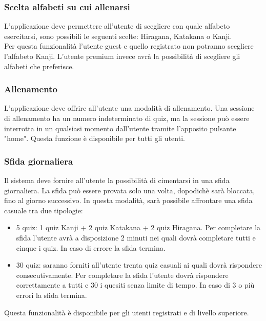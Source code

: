 \subsubsection{Scelta alfabeti su cui allenarsi} \label{req_scelta_alfabeto}
L'applicazione deve permettere all'utente di scegliere con quale alfabeto esercitarsi, sono possibili le seguenti scelte: Hiragana, Katakana o Kanji. \\
Per questa funzionalità l'utente guest e quello registrato non potranno scegliere l'alfabeto Kanji. L'utente premium invece avrà la possibilità di scegliere gli alfabeti che preferisce.

\subsubsection{Allenamento} \label{req_allenamento}
L'applicazione deve offrire all'utente una modalità di allenamento. Una sessione di allenamento ha un numero indeterminato di quiz, ma la sessione può essere interrotta in un qualsiasi momento dall'utente tramite l'apposito pulsante "home". Questa funzione è disponibile per tutti gli utenti.

\subsubsection{Sfida giornaliera} \label{req_sfida_giornaliera}
Il sistema deve fornire all'utente la possibilità di cimentarsi in una sfida giornaliera. La sfida può essere provata solo una volta, dopodichè sarà bloccata, fino al giorno successivo. In questa modalità, sarà possibile affrontare una sfida casuale tra due tipologie:
\begin{itemize}
    \item 5 quiz: 1 quiz Kanji + 2 quiz Katakana + 2 quiz Hiragana. Per completare la sfida l'utente avrà a disposizione 2 minuti nei quali dovrà completare tutti e cinque i quiz.  In caso di errore la sfida termina.
    \item 30 quiz: saranno forniti all'utente trenta quiz casuali ai quali dovrà rispondere consecutivamente. Per completare la sfida l'utente dovrà rispondere correttamente a tutti e 30 i quesiti senza limite di tempo. In caso di 3 o più errori la sfida termina.
\end{itemize}
Questa funzionalità è disponibile per gli utenti registrati e di livello superiore.


